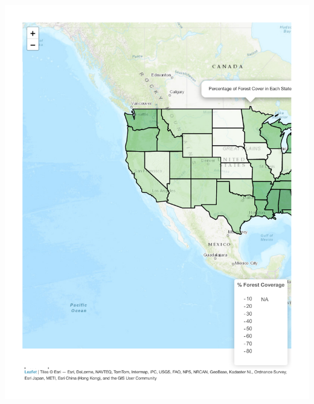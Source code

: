 \documentclass[
  letterpaper,
  DIV=11,
  numbers=noendperiod]{scrartcl}
\begin{document}
\includegraphics{MiniProject1_files/figure-pdf/unnamed-chunk-8-1.pdf}
\end{document}
